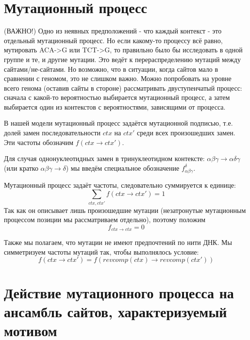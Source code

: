 \documentclass[a4paper]{article}
\begin{document}

\section{Мутационный процесс}

(ВАЖНО!) Одно из неявных предположений - что каждый контекст - это отдельный мутационный процесс. Но если какому-то процессу всё равно, мутировать ACA->G или TCT->G, то правильно было бы исследовать в одной группе и те, и другие мутации. Это ведёт к перераспределению мутаций между сайтами/не-сайтами. Но возможно, что в ситуации, когда сайтов мало в сравнении с геномом, это не слишком важно. Можно попробовать на уровне всего генома (оставив сайты в стороне) рассматривать двуступенчатый процесс: сначала с какой-то вероятностью выбирается мутационный процесс, а затем выбирается один из контекстов с вероятностями, зависящими от процесса.

В нашей модели мутационный процесс задаётся мутационной подписью, т.е. долей замен последовательности $ctx$ на $ctx'$ среди всех произошедших замен. Эти частоты обозначим $f(ctx \to ctx')$. 

Для случая однонуклеотидных замен в тринуклеотидном контексте: $\alpha\beta\gamma\to\alpha\delta\gamma$ (или кратко $\alpha\beta\gamma\to\delta$) мы введём специальное обозначение $f_{\alpha\beta\gamma}^{\delta}$.

Мутационный процесс задаёт частоты, следовательно суммируется к единице:
\begin{equation}
\sum_{ctx,ctx'} f(ctx\to ctx') = 1
\end{equation}
Так как он описывает лишь произошедшие мутации (незатронутые мутационным процессом позиции мы рассматриваем отдельно), поэтому положим 
\begin{equation}
f_{ctx\to ctx} = 0
\end{equation}

Также мы полагаем, что мутации не имеют предпочтений по нити ДНК. Мы симметризуем частоты мутаций так, чтобы выполнялось условие:
\begin{equation}
f(ctx\to ctx') = f(revcomp(ctx)\to revcomp(ctx'))
\end{equation}



\section{Действие мутационного процесса на ансамбль сайтов, характеризуемый мотивом}
\end{document}

